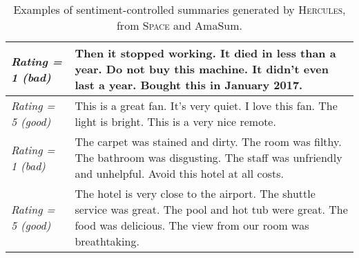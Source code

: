 \documentclass[11pt]{article}
\newcommand\Tstrut{\rule{0pt}{2.6ex}}         \newcommand\Bstrut{\rule[-1.6ex]{0pt}{0pt}}
\begin{document}
 
\begin{table*}[ht]
\renewcommand{\arraystretch}{1.2}
    \centering
    \small
    \begin{tabular}{@{}m{2.5cm}@{~}|@{~}m{12.5cm}@{}}
    \hline\hline
\textit{Rating = 1 (bad)} & \Tstrut Then it stopped working. It died in less than a year. Do not buy this machine. It didn't even last a year. Bought this in January 2017. \\
\hline
\textit{Rating = 5 (good)} & This is a great fan. It's very quiet. I love this fan. The light is bright. This is a very nice remote. \Bstrut \\
\hline\hline
  \textit{Rating = 1 (bad)} &  \Tstrut The carpet was stained and dirty. The room was filthy. The bathroom was disgusting. The staff was unfriendly and unhelpful. Avoid this hotel at all costs. \\
\hline
\textit{Rating = 5 (good) } & The hotel is very close to the airport. The shuttle service was great. The pool and hot tub were great. The food was delicious. The view from our room was breathtaking. \Bstrut \\
\hline\hline
    \end{tabular}
\caption{Examples of sentiment-controlled summaries generated by \textsc{Hercules}, from \textsc{Space} and AmaSum.}
\label{tab:sentiment}
\end{table*}
\end{document}
